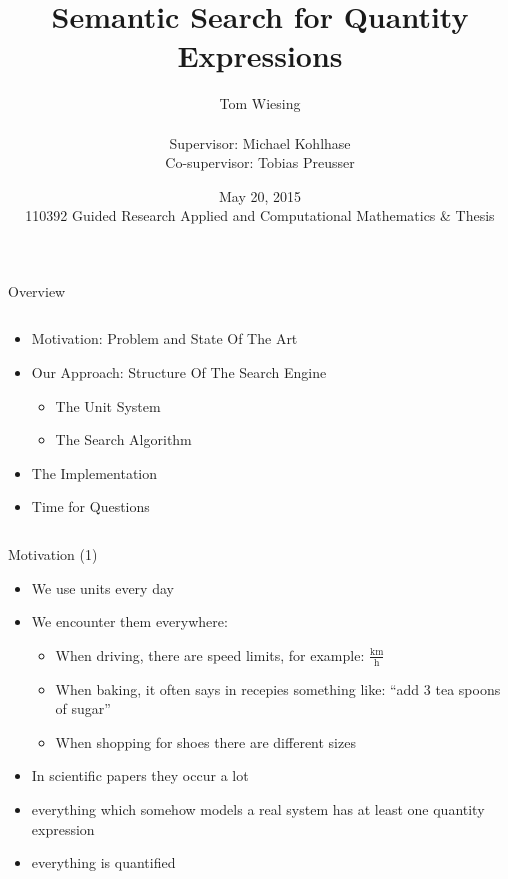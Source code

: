 \documentclass{beamer}
\title{Semantic Search for Quantity Expressions}
\author{Tom Wiesing\\\ \\Supervisor: Michael Kohlhase\\Co-supervisor: Tobias Preusser}
\date{May 20, 2015 \\110392 Guided Research Applied and Computational Mathematics \& Thesis}
\begin{document}
  \frame{\titlepage}

  \begin{frame}{Overview}
    \pause
    \begin{columns}[T]
      \begin{column}[T]{7cm}
        \begin{itemize}[<+->]
          \item Motivation: Problem and State Of The Art
          \item Our Approach: Structure Of The Search Engine
          \begin{itemize}
            \item The Unit System
            \item The Search Algorithm
          \end{itemize}
          \item The Implementation
          \item Time for Questions
        \end{itemize}
      \end{column}
    \end{columns}
  \end{frame}

  \begin{frame}{Motivation (1)}
    \begin{itemize}[<+->]
      \item We use units every day
      \item We encounter them everywhere:
      \begin{itemize}[<+->]
        \item When driving, there are speed limits, for example:  $\frac{\text{km}}{\text{h}}$ %
        \item When baking, it often says in recepies something like: ``add 3 tea spoons of sugar''
        \item When shopping for shoes there are different sizes
      \end{itemize}
      \item In scientific papers they occur a lot
      \item everything which somehow models a real system has at least one quantity expression
      \item everything is quantified
    \end{itemize}
  \end{frame}
\end{document}

